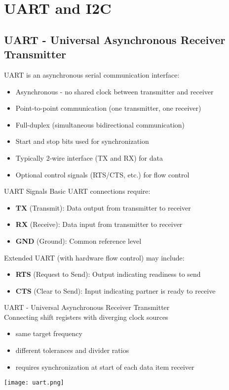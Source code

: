 
\section{UART and I2C}

\subsection{UART - Universal Asynchronous Receiver Transmitter}


\begin{definition}{UART} is an asynchronous serial communication interface:
\begin{itemize}
    \item Asynchronous - no shared clock between transmitter and receiver
    \item Point-to-point communication (one transmitter, one receiver)
    \item Full-duplex (simultaneous bidirectional communication)
    \item Start and stop bits used for synchronization
    \item Typically 2-wire interface (TX and RX) for data
    \item Optional control signals (RTS/CTS, etc.) for flow control
\end{itemize}
\end{definition}

\begin{concept}{UART Signals}
Basic UART connections require:
\begin{itemize}
    \item \textbf{TX} (Transmit): Data output from transmitter to receiver
    \item \textbf{RX} (Receive): Data input from transmitter to receiver
    \item \textbf{GND} (Ground): Common reference level
\end{itemize}
Extended UART (with hardware flow control) may include:
\begin{itemize}
    \item \textbf{RTS} (Request to Send): Output indicating readiness to send
    \item \textbf{CTS} (Clear to Send): Input indicating partner is ready to receive
\end{itemize}
\end{concept}

\begin{definition}{UART - Universal Asynchronous Receiver Transmitter}\\
    Connecting shift registers with diverging clock sources
    \begin{itemize}
        \item same target frequency
        \item different tolerances and divider ratios
        \item requires synchronization at start of each data item receiver
    \end{itemize}
    \texttt{[image: uart.png]}
\end{definition}

